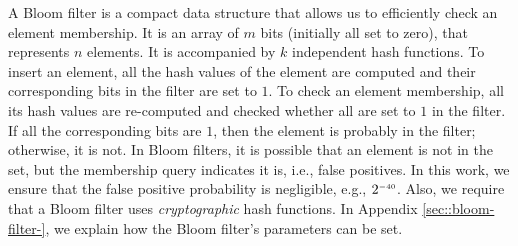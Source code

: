 A Bloom filter \cite{DBLP:journals/cacm/Bloom70} is a compact data structure that allows us to 
efficiently check an  element membership. It is an array of $m$ bits (initially all set to zero), that  represents $n$  elements. It is accompanied by $k$ independent hash functions. To insert an element, all the  hash values of the element are computed and their corresponding bits in the filter are set to $1$. To check an element membership, all its hash values are re-computed and checked whether all are set to $1$ in the filter. If all the corresponding bits are $1$, then the element is probably in the filter; otherwise, it is not. In Bloom filters,  it is possible that an element is not in the set, but the membership query indicates it is, i.e., false positives. In this work, we ensure that the false positive probability is negligible, e.g.,  $2^{\scriptscriptstyle - 40}$. Also, we require that a Bloom filter uses \emph{cryptographic} hash functions. In Appendix \ref{sec::bloom-filter-}, we explain how the Bloom filter's parameters can be set.








%

 

%

